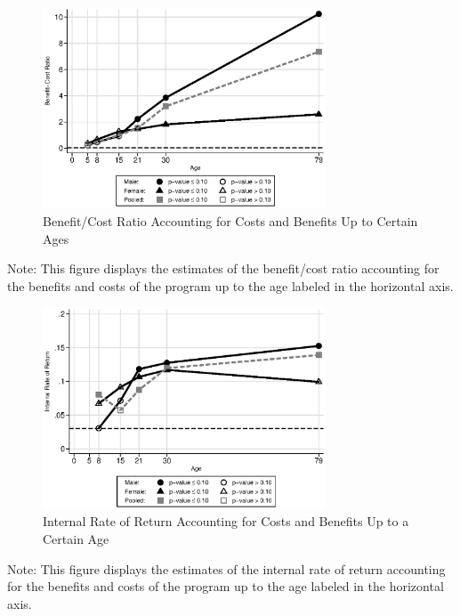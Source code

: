 \documentclass[static]{JJH-Beamer}
\begin{document}
\begin{frame}

\begin{figure}[H]
\caption{Benefit/Cost Ratio Accounting for Costs and Benefits Up to Certain Ages}
\begin{center}
\includegraphics[width=0.75\textwidth]{output/bcr_age.eps}
\end{center}
\end{figure}
{\flushleft \scriptsize Note: This figure displays the estimates of the benefit/cost ratio accounting for the benefits and costs of the program up to the age labeled in the horizontal axis.\\}

\end{frame}

\begin{frame}

\begin{figure}[H]
\caption{Internal Rate of Return Accounting for Costs and Benefits Up to a Certain Age}
\begin{center}
\includegraphics[width=0.75\textwidth]{output/irr_age.eps}
\end{center}
\end{figure}
{\flushleft \scriptsize Note: This figure displays the estimates of the internal rate of return accounting for the benefits and costs of the program up to the age labeled in the horizontal axis.\\}

\end{frame}
\end{document}
